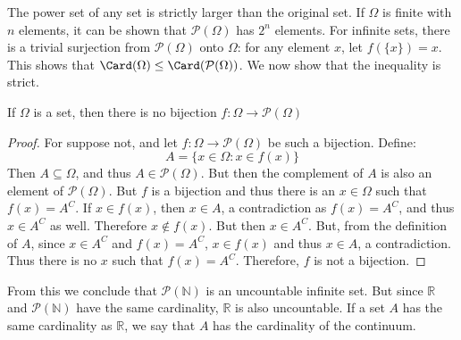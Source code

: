 \documentclass[crop=false,class=book,oneside]{standalone}
\begin{document}
            The power set of any set is strictly larger than the
            original set. If $\Omega$ is finite with $n$ elements, it
            can be shown that $\mathcal{P}(\Omega)$ has $2^{n}$
            elements. For infinite sets, there is a trivial surjection
            from $\mathcal{P}(\Omega)$ onto $\Omega$: for any element
            $x$, let $f(\{x\})=x$. This shows that
            $\Card(\Omega)\leq\Card(\mathcal{P}(\Omega))$. We now show
            that the inequality is strict.
            \begin{theorem}
                If $\Omega$ is a set, then there is no bijection
                $f:\Omega\rightarrow\mathcal{P}(\Omega)$
            \end{theorem}
            \begin{proof}
                For suppose not, and let
                $f:\Omega\rightarrow\mathcal{P}(\Omega)$ be such a
                bijection. Define:
                \begin{equation}
                    A=\{x\in\Omega:x\in{f}(x)\}
                \end{equation}
                Then $A\subseteq\Omega$, and thus
                $A\in\mathcal{P}(\Omega)$. But then the complement of
                $A$ is also an element of $\mathcal{P}(\Omega)$. But
                $f$ is a bijection and thus there is an $x\in\Omega$
                such that $f(x)=A^{C}$. If $x\in{f}(x)$, then
                $x\in{A}$, a contradiction as $f(x)=A^{C}$, and thus
                $x\in{A}^{C}$ as well. Therefore $x\notin{f}(x)$. But
                then $x\in{A}^{C}$. But, from the definition of $A$,
                since $x\in{A}^{C}$ and $f(x)=A^{C}$, $x\in{f}(x)$
                and thus $x\in{A}$, a contradiction. Thus there is no
                $x$ such that $f(x)=A^{C}$. Therefore, $f$ is not a
                bijection.
            \end{proof}
            From this we conclude that $\mathcal{P}(\mathbb{N})$
            is an uncountable infinite set. But since $\mathbb{R}$
            and $\mathcal{P}(\mathbb{N})$ have the same cardinality,
            $\mathbb{R}$ is also uncountable.
            If a set $A$ has the same cardinality as $\mathbb{R}$,
            we say that $A$ has the cardinality of the continuum.
\end{document}
